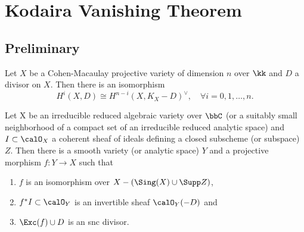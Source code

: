 \section{Kodaira Vanishing Theorem}

\subsection{Preliminary}


    \begin{theorem}\label{thm: Serre duality for line bundles}
        Let \(X\) be a Cohen-Macaulay projective variety of dimension \(n\) over \(\kk\) and \(D\) a divisor on \(X\).
        Then there is an isomorphism
        \[
            H^i(X, D) \cong H^{n-i}(X, K_X - D)^\vee, \quad \forall i = 0, 1, \ldots, n.
        \]
    \end{theorem}


    \begin{theorem}\label{thm: log resolution of singularities}
        Let X be an irreducible reduced algebraic variety over $\bbC$ (or a suitably small neighborhood of a compact set of an irreducible reduced analytic space) and $I \subset \calO_X$ a coherent sheaf of ideals defining a closed subscheme (or subspace) $Z$. Then there is a smooth variety (or analytic space) $Y$ and a projective morphism $f: Y \to X$ such that
        \begin{enumerate}
            \item $f$ is an isomorphism over $X - (\Sing(X) \cup \Supp Z)$,
            \item $f^*I \subset \calO_Y$ is an invertible sheaf $\calO_Y(-D)$ and 
            \item $\Exc(f) \cup D$ is an snc divisor.
        \end{enumerate}
    \end{theorem}

